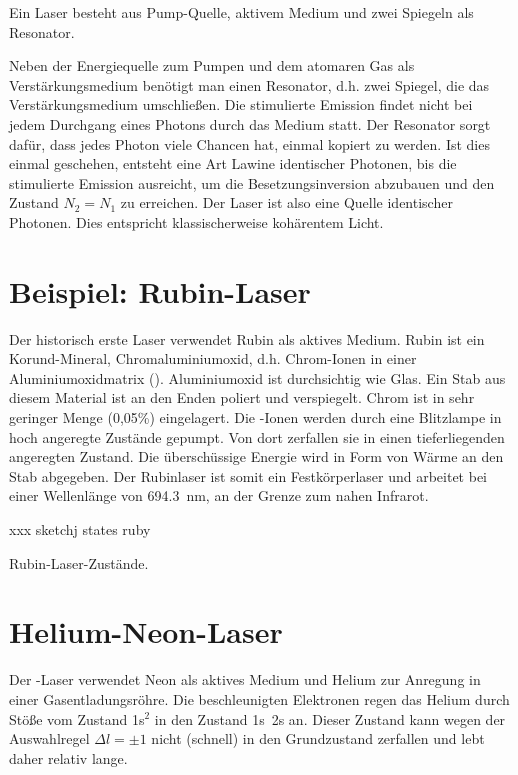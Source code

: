 \begin{marginfigure}
    \caption{Ein Laser besteht aus Pump-Quelle, aktivem Medium und zwei Spiegeln als Resonator.}
    \label{fig:7_laser_design}
\end{marginfigure}


Neben der Energiequelle zum Pumpen und dem atomaren Gas als Verstärkungsmedium benötigt man einen Resonator, d.h. zwei Spiegel, die das Verstärkungsmedium umschließen. Die stimulierte Emission findet nicht bei jedem Durchgang eines Photons durch das Medium statt.  Der Resonator sorgt dafür, dass jedes Photon viele Chancen hat, einmal kopiert zu werden. Ist dies einmal geschehen, entsteht eine Art Lawine identischer Photonen, bis die stimulierte Emission ausreicht, um die Besetzungsinversion abzubauen und den Zustand $N_2 = N_1$ zu erreichen. Der Laser ist also eine Quelle identischer Photonen. Dies entspricht klassischerweise kohärentem Licht.


\section{Beispiel: Rubin-Laser}

Der historisch erste Laser verwendet Rubin als aktives Medium. Rubin ist ein Korund-Mineral, Chromaluminiumoxid, d.h. Chrom-Ionen in einer Aluminiumoxidmatrix (). Aluminiumoxid ist durchsichtig wie Glas. Ein Stab aus diesem Material ist an den Enden poliert und verspiegelt. Chrom ist in sehr geringer Menge (0,05\%) eingelagert. Die -Ionen werden durch eine Blitzlampe in hoch angeregte Zustände gepumpt. Von dort zerfallen sie in einen tieferliegenden angeregten Zustand. Die überschüssige Energie wird in Form von Wärme an den Stab abgegeben. Der Rubinlaser ist somit ein Festkörperlaser und arbeitet bei einer Wellenlänge von 694.3~nm, an der Grenze zum nahen Infrarot. 

\begin{marginfigure}
    xxx sketchj states ruby
    \caption{Rubin-Laser-Zustände.}
    \label{fig:7_ruby_laser}
\end{marginfigure}

\section{Helium-Neon-Laser}

Der -Laser verwendet Neon als aktives Medium und Helium zur Anregung in einer Gasentladungsröhre. Die beschleunigten Elektronen regen das Helium durch Stöße vom Zustand 1s$^2$ in den Zustand 1s~2s an. Dieser Zustand kann wegen der Auswahlregel $\Delta l = \pm1$ nicht (schnell) in den Grundzustand zerfallen und lebt daher relativ lange. 

